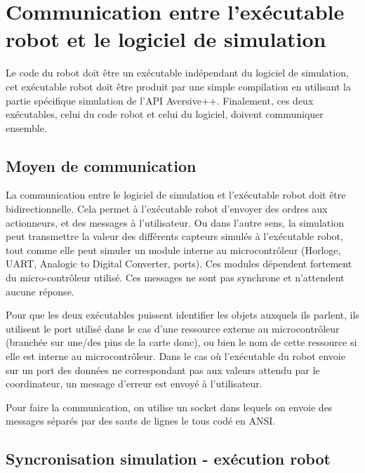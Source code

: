 \section{Communication entre l'exécutable robot et le logiciel de simulation}

Le code du robot doit être un exécutable indépendant du logiciel de simulation, cet exécutable robot doit être produit par une simple compilation en utilisant la partie spécifique simulation de l'API Aversive++. Finalement, ces deux exécutables, celui du code robot et celui du logiciel, doivent communiquer ensemble.

\subsection{Moyen de communication}

La communication entre le logiciel de simulation et l'exécutable robot
doit être bidirectionnelle. Cela permet à l'exécutable robot d'envoyer
des ordres aux actionneurs, et des messages à l'utilisateur. Ou dans
l'autre sens, la simulation peut transmettre la valeur des différents
capteurs simulés à l'exécutable robot, tout comme elle peut simuler un module
interne au microcontrôleur (Horloge, UART, Analogic to Digital
Converter, ports). Ces modules dépendent fortement du micro-contrôleur
utilisé. Ces messages ne sont pas synchrone et
n'attendent aucune réponse.

Pour que les deux exécutables puissent identifier les objets auxquels
ils parlent, ils utilisent le port utilisé dans le cas d'une ressource
externe au microcontrôleur (branchée sur une/des pins de la carte donc), ou bien le nom de cette ressource si elle est interne au microcontrôleur. %
Dans le cas où l'exécutable du robot envoie sur un port des
données ne correspondant pas aux valeurs attendu par le coordinateur,
un message d'erreur est envoyé à l'utilisateur.


Pour faire la communication, on utilise un socket dans lequels on envoie des messages séparés par des sauts de lignes le tous codé en ANSI.
\subsection{Syncronisation simulation - exécution robot}

